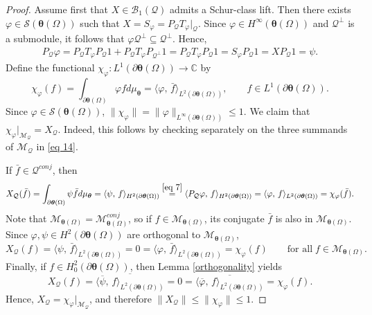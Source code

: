 \documentclass[12pt,reqno]{amsart}
\theoremstyle{remark}
\theoremstyle{definition}
\newcommand{\beqn}{\begin{eqnarray*}}
\newcommand{\eeqn}{\end{eqnarray*}}
\newcommand{\beq}{\begin{eqnarray}}
\newcommand{\eeq}{\end{eqnarray}}
\newcommand{\inp}[2]{\langle{#1},\,{#2} \rangle}
\begin{document}
\begin{proof}
    Assume first that $X\in \mathcal{B}_1(\mathcal{Q})$ admits a Schur-class lift. Then there exists $\varphi\in \mathcal{S}(\boldsymbol\theta(\Omega))$ such that $X=S_{\varphi}=P_{\mathcal{Q}} T_{\varphi}|_{\mathcal{Q}}.$
    Since $\varphi\in H^\infty(\boldsymbol\theta(\Omega))$ and $\mathcal{Q}^\perp$ is a submodule, it follows that $\varphi\mathcal{Q}^\perp \subseteq \mathcal{Q}^\perp.$ Hence, \beq \label{eq 7} P_{\mathcal{Q}}\varphi= P_{\mathcal{Q}}T_\varphi P_{\mathcal{Q}}1+ P_{\mathcal{Q}}T_\varphi P_{\mathcal{Q}^\perp}1=P_{\mathcal{Q}}T_{\varphi}P_{\mathcal{Q}}1=S_{\mathcal{\varphi}} P_{\mathcal{Q}}1=X P_{\mathcal{Q}}1=\psi.\eeq
Define the functional $\chi_{\varphi}: L^1(\partial\boldsymbol\theta(\Omega)) \to \mathbb C$ by 
$$\chi_{\varphi}(f)=\int_{\partial\boldsymbol\theta(\Omega)} \varphi f d\mu_{\boldsymbol\theta} = \inp{\varphi}{\bar{f}}_{L^2(\partial\boldsymbol\theta(\Omega))},\qquad f\in L^1(\partial\boldsymbol\theta(\Omega)).$$
Since $\varphi \in \mathcal{S}(\boldsymbol\theta(\Omega))$, $\|\chi_{\varphi}\| = \| \varphi\|_{L^\infty(\partial\boldsymbol\theta(\Omega))} \leq 1.$ We claim that $\chi_{\varphi}|_{\mathcal{M}_{\mathcal{Q}}}=X_{\mathcal{Q}}.$ Indeed, this follows by checking separately on the three summands of $\mathcal{M}_{\mathcal{Q}}$ in \eqref{eq 14}.
 
 If $\bar{f}\in \mathcal{Q}^{conj}$, then
\beqn X_{\mathcal{Q}}(\bar{f}) = \int_{\partial\boldsymbol\theta(\Omega)} \psi \bar{f} d\mu_{\boldsymbol \theta} = \inp{\psi}{f}_{H^2(\partial\boldsymbol\theta(\Omega))} \overset{\eqref{eq 7}}{=} \inp{P_{\mathcal{Q}} \varphi}{f}_{H^2(\partial\boldsymbol\theta(\Omega))}
= \inp{\varphi}{f}_{L^2(\partial\boldsymbol\theta(\Omega))} = \chi_{\varphi}(\bar{f}).\eeqn
Note that $\mathcal{M}_{\boldsymbol\theta(\Omega)} = \mathcal{M}_{\boldsymbol\theta(\Omega)}^{conj}$, so if $f\in \mathcal{M}_{\boldsymbol\theta(\Omega)}$, its conjugate $\bar{f}$ is also in $\mathcal{M}_{\boldsymbol\theta(\Omega)}$. Since $\varphi, \psi \in H^2(\partial\boldsymbol\theta(\Omega))$ are orthogonal to $\mathcal{M}_{\boldsymbol\theta(\Omega)}$, 
$$ X_{\mathcal{Q}}(f) = \inp{\psi}{\bar{f}}_{L^2(\partial\boldsymbol\theta(\Omega))} = 0 = \inp{\varphi}{\bar{f}}_{L^2(\partial\boldsymbol\theta(\Omega))} = \chi_{\varphi}(f) \qquad \text{for all} \; f\in \mathcal{M}_{\boldsymbol\theta(\Omega)}. $$
Finally, if $f\in H^2_{0}(\partial\boldsymbol\theta(\Omega))$,
then Lemma \ref{orthogonality} yields 
$$ X_{\mathcal{Q}}(f)  = \overline{\inp{\overline{\psi}}{f}_{L^2(\partial\boldsymbol\theta(\Omega))}} = 0 = \overline{\inp{\overline{\varphi}}{f}_{L^2(\partial\boldsymbol\theta(\Omega))}} = \chi_{\varphi}(f). $$
Hence, $X_{\mathcal{Q}} = \chi_{\varphi}|_{\mathcal{M}_{\mathcal{Q}}}$, and therefore $\|X_{\mathcal{Q}}\| \leq \|\chi_{\varphi}\| \leq 1.$


\end{proof}
\end{document}
